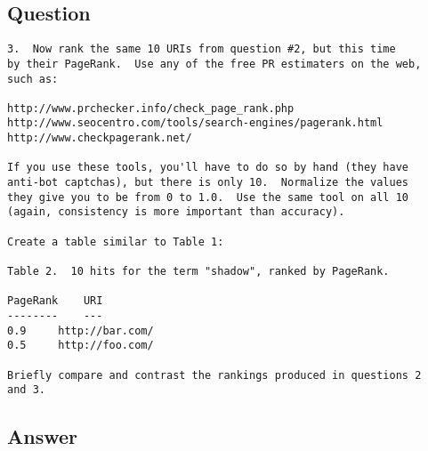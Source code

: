 \documentclass[letterpaper,11pt]{article}
\begin{document}
\subsection*{Question}

\begin{verbatim}
3.  Now rank the same 10 URIs from question #2, but this time 
by their PageRank.  Use any of the free PR estimaters on the web,
such as:

http://www.prchecker.info/check_page_rank.php
http://www.seocentro.com/tools/search-engines/pagerank.html
http://www.checkpagerank.net/

If you use these tools, you'll have to do so by hand (they have
anti-bot captchas), but there is only 10.  Normalize the values
they give you to be from 0 to 1.0.  Use the same tool on all 10
(again, consistency is more important than accuracy).

Create a table similar to Table 1:

Table 2.  10 hits for the term "shadow", ranked by PageRank.

PageRank	URI
--------	---
0.9		http://bar.com/
0.5		http://foo.com/

Briefly compare and contrast the rankings produced in questions 2
and 3.
\end{verbatim}

\newpage
\subsection*{Answer}
\end{document}
